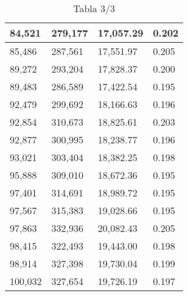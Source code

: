 \begin{table}[H]
{\begin{tabular}{| l | l | l |l |}
84,521	&	279,177	&	17,057.29	&	0.202	\\ \hline
85,486	&	287,561	&	17,551.97	&	0.205	\\ \hline
89,272	&	293,204	&	17,828.37	&	0.200	\\ \hline
89,483	&	286,589	&	17,422.54	&	0.195	\\ \hline
92,479	&	299,692	&	18,166.63	&	0.196	\\ \hline
92,854	&	310,673	&	18,825.61	&	0.203	\\ \hline
92,877	&	300,995	&	18,238.77	&	0.196	\\ \hline
93,021	&	303,404	&	18,382.25	&	0.198	\\ \hline
95,888	&	309,010	&	18,672.36	&	0.195	\\ \hline
97,401	&	314,691	&	18,989.72	&	0.195	\\ \hline
97,567	&	315,383	&	19,028.66	&	0.195	\\ \hline
97,863	&	332,936	&	20,082.43	&	0.205	\\ \hline
98,415	&	322,493	&	19,443.00	&	0.198	\\ \hline
98,914	&	327,398	&	19,730.04	&	0.199	\\ \hline
100,032	&	327,654	&	19,726.19	&	0.197	\\ \hline



  \end{tabular}
   \caption*{Tabla 3/3}
}
\end{table}